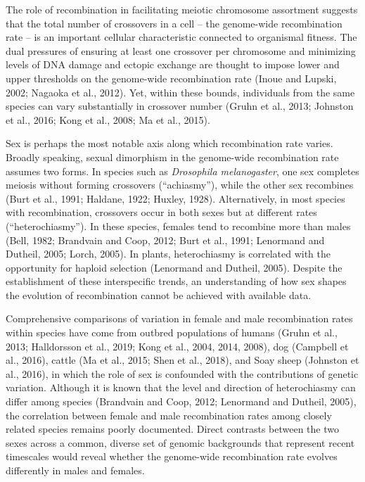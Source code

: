 \documentclass[
]{article}
\begin{document}
The role of recombination in facilitating meiotic chromosome assortment
suggests that the total number of crossovers in a cell -- the
genome-wide recombination rate -- is an important cellular
characteristic connected to organismal fitness. The dual pressures of
ensuring at least one crossover per chromosome and minimizing levels of
DNA damage and ectopic exchange are thought to impose lower and upper
thresholds on the genome-wide recombination rate (Inoue and Lupski,
2002; Nagaoka et al., 2012). Yet, within these bounds, individuals from
the same species can vary substantially in crossover number (Gruhn et
al., 2013; Johnston et al., 2016; Kong et al., 2008; Ma et al., 2015).

Sex is perhaps the most notable axis along which recombination rate
varies. Broadly speaking, sexual dimorphism in the genome-wide
recombination rate assumes two forms. In species such as
\emph{Drosophila melanogaster}, one sex completes meiosis without
forming crossovers (``achiasmy''), while the other sex recombines (Burt
et al., 1991; Haldane, 1922; Huxley, 1928). Alternatively, in most
species with recombination, crossovers occur in both sexes but at
different rates (``heterochiasmy''). In these species, females tend to
recombine more than males (Bell, 1982; Brandvain and Coop, 2012; Burt et
al., 1991; Lenormand and Dutheil, 2005; Lorch, 2005). In plants,
heterochiasmy is correlated with the opportunity for haploid selection
(Lenormand and Dutheil, 2005). Despite the establishment of these
interspecific trends, an understanding of how sex shapes the evolution
of recombination cannot be achieved with available data.

Comprehensive comparisons of variation in female and male recombination
rates within species have come from outbred populations of humans (Gruhn
et al., 2013; Halldorsson et al., 2019; Kong et al., 2004, 2014, 2008),
dog (Campbell et al., 2016), cattle (Ma et al., 2015; Shen et al.,
2018), and Soay sheep (Johnston et al., 2016), in which the role of sex
is confounded with the contributions of genetic variation. Although it
is known that the level and direction of heterochiasmy can differ among
species (Brandvain and Coop, 2012; Lenormand and Dutheil, 2005), the
correlation between female and male recombination rates among closely
related species remains poorly documented. Direct contrasts between the
two sexes across a common, diverse set of genomic backgrounds that
represent recent timescales would reveal whether the genome-wide
recombination rate evolves differently in males and females.
\end{document}
